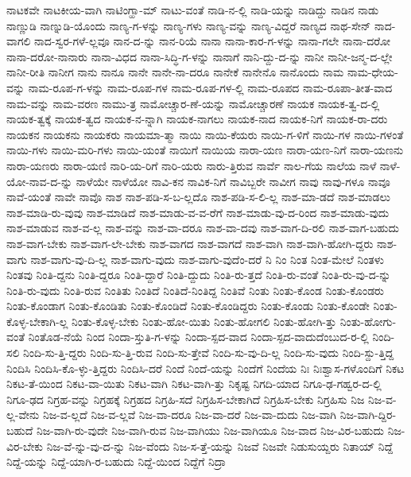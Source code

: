 {ನಾಟಕವೇ
ನಾಟಕೀಯ-ವಾಗಿ
ನಾಟಿಂಗ್ಹಾ-ಮ್
ನಾಟು-ವಂತೆ
ನಾಡಿ-ನ-ಲ್ಲಿ
ನಾಡಿ-ಯನ್ನು
ನಾಡಿದ್ದು
ನಾಡಿನ
ನಾಡು
ನಾಣ್ಣುಡಿ
ನಾಣ್ನುಡಿ-ಯೊಂದು
ನಾಣ್ಯ-ಗ-ಳನ್ನು
ನಾಣ್ಯ-ಗಳು
ನಾಣ್ಯ-ವನ್ನು
ನಾಣ್ಯ-ವಿದ್ದರೆ
ನಾಣ್ಯದ
ನಾಥ-ಸೇನ್
ನಾದ-ವಾಗಲಿ
ನಾದ-ಸ್ವರ-ಗಳೆ-ಲ್ಲವೂ
ನಾನ-ದ-ನ್ನು
ನಾನ-ರಿಯೆ
ನಾನಾ
ನಾನಾ-ಕಾರ-ಗ-ಳನ್ನು
ನಾನಾ-ಗಲೇ
ನಾನಾ-ದರೋ
ನಾನಾ-ದರೋ-ನಾನಾರು
ನಾನಾ-ವಿಧದ
ನಾನಾ-ಸಿದ್ಧಿ-ಗ-ಳನ್ನು
ನಾನಾಗೆ
ನಾನಿ-ದ್ದು-ದ-ನ್ನು
ನಾನೀ
ನಾನೀ-ಜನ್ಮ-ದ-ಲ್ಲೇ
ನಾನೀ-ರೀತಿ
ನಾನೀಗ
ನಾನು
ನಾನೂ
ನಾನೇ
ನಾನೇ-ನಾ-ದರೂ
ನಾನೇಕೆ
ನಾನೇನೊ
ನಾನೊಂದು
ನಾಮ
ನಾಮ-ಧೇಯ-ವನ್ನು
ನಾಮ-ರೂಪ-ಗ-ಳನ್ನು
ನಾಮ-ರೂಪ-ಗಳ
ನಾಮ-ರೂಪ-ಗಳ-ಲ್ಲಿ
ನಾಮ-ರೂಪದ
ನಾಮ-ರೂಪಾ-ತೀತ-ವಾದ
ನಾಮ-ವನ್ನು
ನಾಮ-ವರಣ
ನಾಮು-ತ್ರ
ನಾಮೋಚ್ಚಾರ-ಣೆ-ಯನ್ನು
ನಾಮೋಚ್ಚಾರಣೆ
ನಾಯಕ
ನಾಯಕ-ತ್ವ-ದ-ಲ್ಲಿ
ನಾಯಕ-ತ್ವಕ್ಕೆ
ನಾಯಕ-ತ್ವದ
ನಾಯಕ-ನ-ನ್ನಾಗಿ
ನಾಯಕ-ನಾಗಲು
ನಾಯಕ-ನಾದ
ನಾಯಕ-ನಿಗೆ
ನಾಯಕ-ರಾ-ದರು
ನಾಯಕನ
ನಾಯಕನು
ನಾಯಕರು
ನಾಯಮಾ-ತ್ಮಾ
ನಾಯಿ
ನಾಯಿ-ಕೆಯರು
ನಾಯಿ-ಗ-ಳಿಗೆ
ನಾಯಿ-ಗಳ
ನಾಯಿ-ಗಳಂತೆ
ನಾಯಿ-ಗಳು
ನಾಯಿ-ಮರಿ-ಗಳು
ನಾಯಿ-ಯಂತೆ
ನಾಯಿಗೆ
ನಾಯಿಯ
ನಾರಾ-ಯಣ
ನಾರಾ-ಯಣ-ನಿಗೆ
ನಾರಾ-ಯಣನು
ನಾರಾ-ಯಣರು
ನಾರಾ-ಯಣಿ
ನಾರಿ-ಯ-ರಿಗೆ
ನಾರಿ-ಯರು
ನಾರು-ತ್ತಿರುವ
ನಾರ್ವೆ
ನಾಲ-ಗೆಯ
ನಾಲೆಯ
ನಾಳೆ
ನಾಳೆ-ಯೋ-ನಾವ-ದ-ನ್ನು
ನಾಳೆಯೇ
ನಾಳೆಯೋ
ನಾವಿ-ಕನ
ನಾವಿಕ-ನಿಗೆ
ನಾವಿಬ್ಬರೇ
ನಾವೀಗ
ನಾವು
ನಾವು-ಗಳೂ
ನಾವೂ
ನಾವೆ-ಯಂತೆ
ನಾವೇ
ನಾವೊ
ನಾಶ
ನಾಶ-ಪಡಿ-ಸ-ಬ-ಲ್ಲದೊ
ನಾಶ-ಪಡಿ-ಸ-ಲಿ-ಲ್ಲ
ನಾಶ-ಮಾ-ಡದೆ
ನಾಶ-ಮಾಡಲು
ನಾಶ-ಮಾಡಿ-ರು-ವುವು
ನಾಶ-ಮಾಡಿದೆ
ನಾಶ-ಮಾಡು-ವ-ವ-ರೆಗೆ
ನಾಶ-ಮಾಡು-ವು-ದ-ರಿಂದ
ನಾಶ-ಮಾಡು-ವುದು
ನಾಶ-ಮಾಡುವ
ನಾಶ-ವ-ಲ್ಲ
ನಾಶ-ವನ್ನು
ನಾಶ-ವಾ-ದರೂ
ನಾಶ-ವಾ-ದವು
ನಾಶ-ವಾಗ-ದಿ-ರಲಿ
ನಾಶ-ವಾಗ-ಬಹುದು
ನಾಶ-ವಾಗ-ಬೇಕು
ನಾಶ-ವಾಗ-ಲೇ-ಬೇಕು
ನಾಶ-ವಾಗದ
ನಾಶ-ವಾಗದೆ
ನಾಶ-ವಾಗಿ
ನಾಶ-ವಾಗಿ-ಹೋಗಿ-ದ್ದರು
ನಾಶ-ವಾಗು
ನಾಶ-ವಾಗು-ವು-ದಿ-ಲ್ಲ
ನಾಶ-ವಾಗು-ವುದು
ನಾಶ-ವಾಗು-ವುದೆಂ-ದರೆ
ನಿ
ನಿಂ
ನಿಂತ
ನಿಂತ-ಮೇಲೆ
ನಿಂತಳು
ನಿಂತವು
ನಿಂತಿ-ದ್ದನು
ನಿಂತಿ-ದ್ದರೂ
ನಿಂತಿ-ದ್ದಾರೆ
ನಿಂತಿ-ದ್ದುದು
ನಿಂತಿ-ರು-ತ್ತದೆ
ನಿಂತಿ-ರು-ವಂತೆ
ನಿಂತಿ-ರು-ವು-ದ-ನ್ನು
ನಿಂತಿ-ರು-ವುದು
ನಿಂತಿ-ರುವ
ನಿಂತಿತು
ನಿಂತಿದೆ
ನಿಂತಿದೆ-ನಿಂತಿದ್ದ
ನಿಂತಿವೆ
ನಿಂತು
ನಿಂತು-ಕೊಂಡ
ನಿಂತು-ಕೊಂಡರು
ನಿಂತು-ಕೊಂಡಾಗ
ನಿಂತು-ಕೊಂಡಿತು
ನಿಂತು-ಕೊಂಡಿದೆ
ನಿಂತು-ಕೊಂಡಿದ್ದರು
ನಿಂತು-ಕೊಂಡು
ನಿಂತು-ಕೊಂಡೇ
ನಿಂತು-ಕೊಳ್ಳ-ಬೇಕಾಗಿ-ಲ್ಲ
ನಿಂತು-ಕೊಳ್ಳ-ಬೇಕು
ನಿಂತು-ಹೋ-ಯಿತು
ನಿಂತು-ಹೋಗಲಿ
ನಿಂತು-ಹೋಗಿ-ತ್ತು
ನಿಂತು-ಹೋಗು-ವಂತೆ
ನಿಂತೊಡ-ನೆಯೆ
ನಿಂದ
ನಿಂದಾ-ಸ್ತುತಿ-ಗ-ಳನ್ನು
ನಿಂದಾ-ಸ್ಪದ-ವಾದ
ನಿಂದಾ-ಸ್ಪದ-ವಾದುದೆಂಬುದ-ರ-ಲ್ಲಿ
ನಿಂದಿ-ಸಲಿ
ನಿಂದಿ-ಸು-ತ್ತಿ-ದ್ದರು
ನಿಂದಿ-ಸು-ತ್ತಿ-ರುವ
ನಿಂದಿ-ಸು-ತ್ತೇವೆ
ನಿಂದಿ-ಸು-ವು-ದಿ-ಲ್ಲ
ನಿಂದಿ-ಸು-ವುದು
ನಿಂದಿ-ಸ್ದು-ತ್ತಿದ್ದ
ನಿಂದಿಸಿ
ನಿಂದಿಸಿ-ಕೊ-ಳ್ಳು-ತ್ತಿದ್ದರು
ನಿಂದಿಸಿ-ದರೆ
ನಿಂದೆ
ನಿಂದೆ-ಯನ್ನು
ನಿಂದೆಗೆ
ನಿಂದೆಯ
ನಿಃ
ನಿಃಶ್ವಾಸ-ಗಳೊಂದಿಗೆ
ನಿಕಟ
ನಿಕಟ-ತೆ-ಯಿಂದ
ನಿಕಟ-ವಾ-ಯಿತು
ನಿಕಟ-ವಾಗಿ
ನಿಕಟ-ವಾಗಿ-ತ್ತು
ನಿಕೃಷ್ಟ
ನಿಗದಿ-ಯಾದ
ನಿಗೂ-ಢ-ಗಹ್ವರ-ದ-ಲ್ಲಿ
ನಿಗೂ-ಢದ
ನಿಗ್ರಹ-ವನ್ನು
ನಿಗ್ರಹಕ್ಕೆ
ನಿಗ್ರಹದ
ನಿಗ್ರಹಿ-ಸದೆ
ನಿಗ್ರಹಿಸ-ಬೇಕಾಗಿದೆ
ನಿಗ್ರಹಿಸ-ಬೇಕು
ನಿಗ್ರಹಿಸು
ನಿಜ
ನಿಜ-ವ-ಲ್ಲ-ವೇನು
ನಿಜ-ವ-ಲ್ಲದೆ
ನಿಜ-ವ-ಲ್ಲವೆ
ನಿಜ-ವಾ-ದರೂ
ನಿಜ-ವಾ-ದರೆ
ನಿಜ-ವಾ-ದುದು
ನಿಜ-ವಾಗಿ
ನಿಜ-ವಾಗಿ-ದ್ದಿರ-ಬಹುದೆ
ನಿಜ-ವಾಗಿ-ರು-ವುದೇ
ನಿಜ-ವಾಗಿ-ರುವ
ನಿಜ-ವಾಗಿಯು
ನಿಜ-ವಾಗಿಯೂ
ನಿಜ-ವಾದ
ನಿಜ-ವಿರ-ಬಹುದು
ನಿಜ-ವಿರ-ಬೇಕು
ನಿಜ-ವೆ-ನ್ನು-ವು-ದ-ನ್ನು
ನಿಜ-ವೆಂದು
ನಿಜ-ಸ-ತ್ತೆ-ಯನ್ನು
ನಿಜವೆ
ನಿಜವೇ
ನಿಡುಸುಯ್ದರು
ನಿತಾಯ್
ನಿದ್ದೆ
ನಿದ್ದೆ-ಯನ್ನು
ನಿದ್ದೆ-ಯಾಗಿ-ರ-ಬಹುದು
ನಿದ್ದೆ-ಯಿಂದ
ನಿದ್ದೆಗೆ
ನಿದ್ರಾ
}
